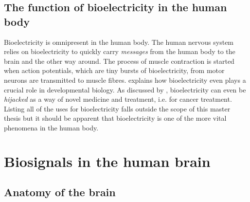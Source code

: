 


\subsection{The function of bioelectricity in the human body}
\label{subsec:biomedical_signals_biosignals_in_human_why}


Bioelectricity is omnipresent in the human body. 
The human nervous system relies on bioelectricity to quickly carry \textit{messages} from the human body to the brain and the other way around.
The process of muscle contraction is started when action potentials, which are tiny bursts of bioelectricity, from motor neurons are transmitted to muscle fibres.
 explains how bioelectricity even plays a crucial role in developmental biology.
As discussed by \citet{bioelectricity_cancer}, bioelectricity can even be \textit{hijacked} as a way of novel medicine and treatment, i.e. for cancer treatment.
Listing all of the uses for bioelectricity falls outside the scope of this master thesis but it should be apparent that bioelectricity is one of the more vital phenomena in the human body.



\section{Biosignals in the human brain}
\label{sec:biomedical_signals_from_brain}

\lipsum[1-2]



\subsection{Anatomy of the brain}
\label{subsec:biomedical_signals_from_brain_anatomy}

